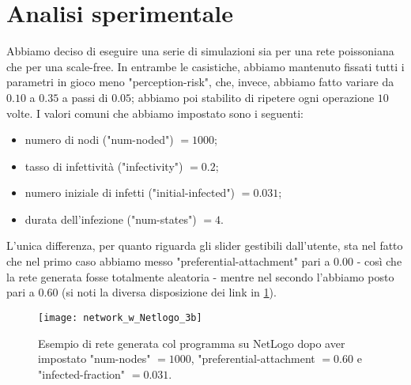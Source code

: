 \section{Analisi sperimentale}
Abbiamo deciso di eseguire una serie di simulazioni sia per una rete poissoniana che per una scale-free. In entrambe le casistiche, abbiamo mantenuto fissati tutti i parametri in gioco meno "perception-risk", che, invece, abbiamo fatto variare da $ 0.10 $ a $ 0.35 $ a passi di $ 0.05 $; abbiamo poi stabilito di ripetere ogni operazione $ 10 $ volte. I valori comuni che abbiamo impostato sono i seguenti:
\begin{itemize}
\item numero di nodi ("num-noded") $ = 1000 $;
\item tasso di infettività ("infectivity") $ = 0.2 $;
\item numero iniziale di infetti ("initial-infected") $ = 0.031 $;
\item durata dell'infezione ("num-states") $ = 4 $.
\end{itemize}
%
L'unica differenza, per quanto riguarda gli slider gestibili dall'utente, sta nel fatto che nel primo caso abbiamo messo "preferential-attachment" pari a $ 0.00 $  - così che la rete generata fosse totalmente aleatoria - mentre nel secondo l'abbiamo posto pari a $ 0.60 $ (si noti la diversa disposizione dei link in \cref{fig:NetLogo2}).
\begin{figure}[t]
		\begin{center}
			\texttt{[image: network\_w\_Netlogo\_3b]}
			\caption{Esempio di rete generata col programma su NetLogo dopo aver impostato "num-nodes" $= 1000 $, "preferential-attachment $= 0.60 $ e "infected-fraction" $= 0.031 $.}
			\label{fig:NetLogo2}
		\end{center}
\end{figure}
